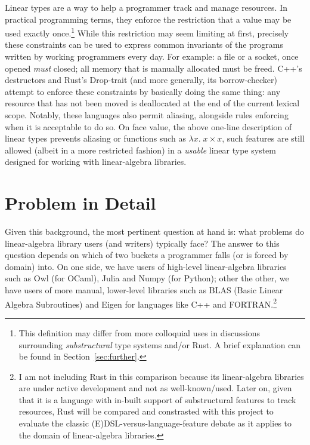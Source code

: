 Linear types are a way to help a programmer track and manage resources. In
practical programming terms, they enforce the restriction that a value may be
used exactly once.\footnote{This definition may differ from more colloquial
uses in discussions surrounding \emph{substructural} type systems and/or Rust.
A brief explanation can be found in Section~\ref{sec:further}.} While this
restriction may seem limiting at first, precisely these constraints can be used
to express common invariants of the programs written by working programmers
every day. For example: a file or a socket, once opened \emph{must} closed; all
memory that is manually allocated must be freed.  C++'s destructors and Rust's
Drop-trait (and more generally, its borrow-checker) attempt to enforce these
constraints by basically doing the same thing: any resource that has not been
moved is deallocated at the end of the current lexical scope. Notably, these
languages also permit aliasing, alongside rules enforcing when it is acceptable
to do so.  On face value, the above one-line description of linear types
prevents aliasing or functions such as $\lambda x.\;x \times x$, such features
are still allowed (albeit in a more restricted fashion) in a \emph{usable}
linear type system designed for working with linear-algebra libraries.

\section{Problem in Detail}
Given this background, the most pertinent question at hand is: what problems do
linear-algebra library users (and writers) typically face? The answer to this
question depends on which of two buckets a programmer falls (or is forced by
domain) into. On one side, we have users of high-level linear-algebra libraries such
as Owl (for OCaml), Julia and Numpy (for Python); other the other, we have
users of more manual, lower-level libraries such as BLAS (Basic Linear Algebra
Subroutines) and Eigen for languages like C++ and FORTRAN.\footnote{I am not including
Rust in this comparison because its linear-algebra libraries are under active
development and not as well-known/used. Later on, given that it is a language
with in-built support of substructural features to track resources, Rust will
be compared and constrasted with this project to evaluate the classic
(E)DSL-versus-language-feature debate as it applies to the domain of
linear-algebra libraries.}

